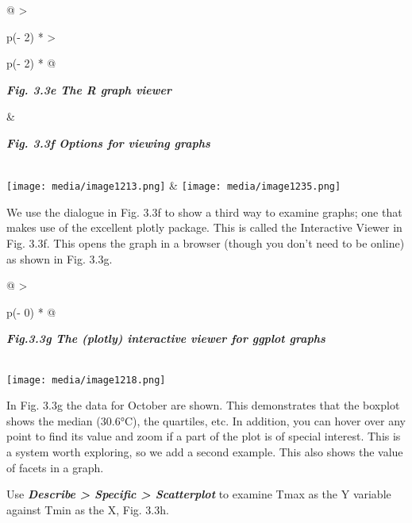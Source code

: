 \documentclass[
  letterpaper,
  DIV=11,
  numbers=noendperiod]{scrreprt}
\begin{document}
\begin{longtable}[]{@{}
  >{\raggedright\arraybackslash}p{(\columnwidth - 2\tabcolsep) * }
  >{\raggedright\arraybackslash}p{(\columnwidth - 2\tabcolsep) * }@{}}
\toprule\noalign{}
\begin{minipage}[b]{\linewidth}\raggedright
\textbf{\emph{Fig. 3.3e The R graph viewer}}
\end{minipage} & \begin{minipage}[b]{\linewidth}\raggedright
\textbf{\emph{Fig. 3.3f Options for viewing graphs}}
\end{minipage} \\
\midrule\noalign{}
\endhead
\bottomrule\noalign{}
\endlastfoot
\texttt{[image: media/image1213.png]} &
\texttt{[image: media/image1235.png]} \\
\end{longtable}

We use the dialogue in Fig. 3.3f to show a third way to examine graphs;
one that makes use of the excellent plotly package. This is called the
Interactive Viewer in Fig. 3.3f. This opens the graph in a browser
(though you don't need to be online) as shown in Fig. 3.3g.

\begin{longtable}[]{@{}
  >{\raggedright\arraybackslash}p{(\columnwidth - 0\tabcolsep) * }@{}}
\toprule\noalign{}
\begin{minipage}[b]{\linewidth}\raggedright
\textbf{\emph{Fig.3.3g The (plotly) interactive viewer for ggplot
graphs}}
\end{minipage} \\
\midrule\noalign{}
\endhead
\bottomrule\noalign{}
\endlastfoot
\texttt{[image: media/image1218.png]} \\
\end{longtable}

In Fig. 3.3g the data for October are shown. This demonstrates that the
boxplot shows the median (30.6°C), the quartiles, etc. In addition, you
can hover over any point to find its value and zoom if a part of the
plot is of special interest. This is a system worth exploring, so we add
a second example. This also shows the value of facets in a graph.

Use \textbf{\emph{Describe \textgreater{} Specific \textgreater{}
Scatterplot}} to examine Tmax as the Y variable against Tmin as the X,
Fig. 3.3h.
\end{document}
